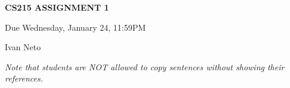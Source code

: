 \documentclass{article}
\begin{document}
\rhead{\thepage}



\pagestyle{fancy}

\cfoot{}

\begin{center}

\large{\textbf{CS215 ASSIGNMENT 1}}

Due Wednesday, January 24, 11:59PM

Ivan Neto

\end{center}

\noindent \textit{Note that students are NOT allowed to copy sentences without showing their references.}

\vskip 0.2in





\newpage





\newpage





\newpage


\end{document}
